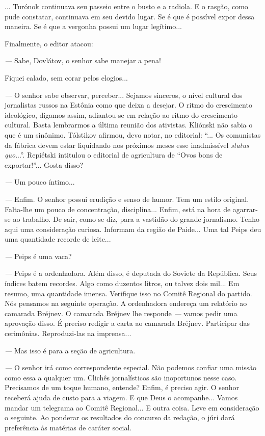 ... Turónok continuava seu passeio entre o busto e a radiola. E o
rasgão, como pude constatar, continuava em seu devido lugar. Se é que é
possível expor dessa maneira. Se é que a vergonha possui um lugar
legítimo...

Finalmente, o editor atacou:

\emph{---} Sabe, Dovlátov, o senhor sabe manejar a pena!

Fiquei calado, sem corar pelos elogios...

\emph{---} O senhor sabe observar, perceber... Sejamos sinceros, o nível
cultural dos jornalistas russos na Estônia como que deixa a desejar. O
ritmo do crescimento ideológico, digamos assim, adiantou-se em relação
ao ritmo do crescimento cultural. Basta lembrarmos a última reunião dos
ativistas. Kliónski não sabia o que é um sinônimo. Tólstikov afirmou,
devo notar, no editorial: ``... Os comunistas da fábrica devem estar
liquidando nos próximos meses esse inadmissível \emph{status quo}...''.
Repiétski intitulou o editorial de agricultura de ``Ovos bons de
exportar!''... Gosta disso?

\emph{---} Um pouco íntimo...

\emph{---} Enfim. O senhor possui erudição e senso de humor. Tem um
estilo original. Falta-lhe um pouco de concentração, disciplina...
Enfim, está na hora de agarrar-se ao trabalho. De sair, como se diz,
para a vastidão do grande jornalismo. Tenho aqui uma consideração
curiosa. Informam da região de Paide... Uma tal Peips deu uma quantidade
recorde de leite...

\emph{---} Peips é uma vaca?

\emph{---} Peips é a ordenhadora. Além disso, é deputada do Soviete da
República. Seus índices batem recordes. Algo como duzentos litros, ou
talvez dois mil... Em resumo, uma quantidade imensa. Verifique isso no
Comitê Regional do partido. Nós pensamos na seguinte operação. A
ordenhadora endereça um relatório ao camarada Bréjnev. O camarada
Bréjnev lhe responde \emph{---} vamos pedir uma aprovação disso. É
preciso redigir a carta ao camarada Bréjnev. Participar das cerimônias.
Reproduzi-las na imprensa...

\emph{---} Mas isso é para a seção de agricultura.

\emph{---} O senhor irá como correspondente especial. Não podemos
confiar uma missão como essa a qualquer um. Clichês jornalísticos são
inoportunos nesse caso. Precisamos de um toque humano, entende? Enfim, é
preciso agir. O senhor receberá ajuda de custo para a viagem. E que Deus
o acompanhe... Vamos mandar um telegrama ao Comitê Regional... E outra
coisa. Leve em consideração o seguinte. Ao ponderar os resultados do
concurso da redação, o júri dará preferência às matérias de caráter
social.

